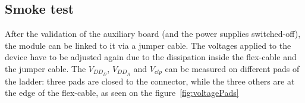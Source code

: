 



  \subsection{Smoke test}


  After the validation of the auxiliary board (and the power supplies switched-off), the module can be linked to it via a jumper cable.
  The voltages applied to the device have to be adjusted again due to the dissipation inside the flex-cable and the jumper cable.
  The $V_{DD_D}$, $V_{DD_A}$ and $V_{clp}$ can be measured on different pads of the ladder: three pads are closed to the connector, while the three others are at the edge of the flex-cable, as seen on the figure~\ref{fig:voltagePads}

